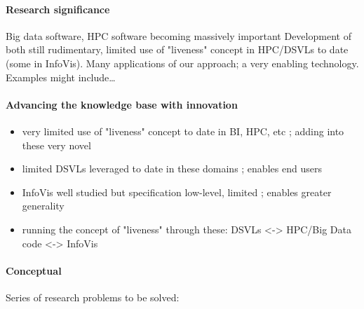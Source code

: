 \documentclass[a4paper]{scrartcl}
\begin{document}




\paragraph*{Research significance}

Big data software, HPC software becoming massively important
Development of both still rudimentary, limited use of "liveness"
concept in HPC/DSVLs to date (some in InfoVis). Many applications of
our approach; a very enabling technology. Examples might include\ldots

\paragraph*{Advancing the knowledge base with innovation}

\begin{itemize}
\item very limited use of "liveness" concept to date in BI, HPC, etc ;
  adding into these very novel
\item limited DSVLs leveraged to date in these domains ; enables end
  users
\item InfoVis well studied but specification low-level, limited ;
  enables greater generality
\item running the concept of "liveness" through these: DSVLs <->
  HPC/Big Data code <-> InfoVis
\end{itemize}

\paragraph*{Conceptual}

Series of research problems to be solved:
\end{document}
